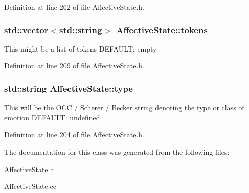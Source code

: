 \-Definition at line 262 of file \-Affective\-State.\-h.

\hypertarget{class_affective_state_a80a1bb184121a40c28c1d3ff103fd47f}{
\subsubsection[{tokens}]{\setlength{\rightskip}{0pt plus 5cm}std\-::vector$<$std\-::string$>$ {\bf \-Affective\-State\-::tokens}}}
\label{class_affective_state_a80a1bb184121a40c28c1d3ff103fd47f}
\-This might be a list of tokens \-D\-E\-F\-A\-U\-L\-T\-: empty 

\-Definition at line 209 of file \-Affective\-State.\-h.

\hypertarget{class_affective_state_ad46f24a9835b890cfe147ae0463d01bf}{
\subsubsection[{type}]{\setlength{\rightskip}{0pt plus 5cm}std\-::string {\bf \-Affective\-State\-::type}}}
\label{class_affective_state_ad46f24a9835b890cfe147ae0463d01bf}
\-This will be the \-O\-C\-C / \-Scherer / \-Becker string denoting the type or class of emotion \-D\-E\-F\-A\-U\-L\-T\-: undefined 

\-Definition at line 204 of file \-Affective\-State.\-h.



\-The documentation for this class was generated from the following files\-:\begin{DoxyCompactItemize}
\item 
\-Affective\-State.\-h\item 
\-Affective\-State.\-cc\end{DoxyCompactItemize}
